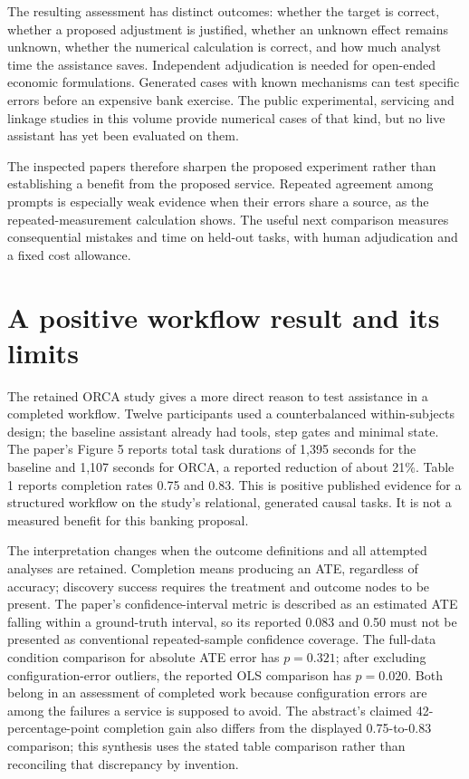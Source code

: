 The resulting assessment has distinct outcomes: whether the target is correct,
whether a proposed adjustment is justified, whether an unknown effect remains
unknown, whether the numerical calculation is correct, and how much analyst
time the assistance saves. Independent adjudication is needed for open-ended
economic formulations. Generated cases with known mechanisms can test
specific errors before an expensive bank exercise. The public experimental,
servicing and linkage studies in this volume provide numerical cases of that
kind, but no live assistant has yet been evaluated on them.

The inspected papers therefore sharpen the proposed experiment rather
than establishing a benefit from the proposed service. Repeated agreement
among prompts is especially weak evidence when their errors share a source,
as the repeated-measurement calculation shows. The useful next comparison
measures consequential mistakes and time on held-out tasks, with human
adjudication and a fixed cost allowance.




\section{A positive workflow result and its limits}
The retained ORCA study gives a more direct reason to test assistance in a
completed workflow. Twelve participants used a counterbalanced within-subjects
design; the baseline assistant already had tools, step gates and minimal
state. The paper's Figure 5 reports total task durations of 1,395 seconds
for the baseline and 1,107 seconds for ORCA, a reported reduction of about
21\%. Table 1 reports completion rates 0.75 and 0.83. This is positive
published evidence for a structured workflow on the study's relational,
generated causal tasks. It is not a measured benefit for this banking
proposal. \citep[pp.~3--5]{exec13_census_orca}

The interpretation changes when the outcome definitions and all attempted
analyses are retained. Completion means producing an ATE, regardless of
accuracy; discovery success requires the treatment and outcome nodes to be
present. The paper's confidence-interval metric is described as an estimated
ATE falling within a ground-truth interval, so its reported 0.083 and 0.50
must not be presented as conventional repeated-sample confidence coverage.
The full-data condition comparison for absolute ATE error has $p=0.321$;
after excluding configuration-error outliers, the reported OLS comparison
has $p=0.020$. Both belong in an assessment of completed work because
configuration errors are among the failures a service is supposed to avoid.
The abstract's claimed 42-percentage-point completion gain also differs
from the displayed 0.75-to-0.83 comparison; this synthesis uses the stated
table comparison rather than reconciling that discrepancy by invention.
\citep[pp.~1, 5, 17--18]{exec13_census_orca}

